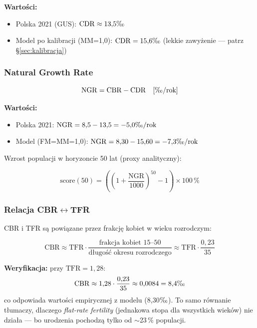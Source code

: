 \documentclass[11pt,a4paper]{article}
\newcommand{\promile}{\ensuremath{\text{\textperthousand}}}
\begin{document}
\textbf{Wartości:}
\begin{itemize}
  \item Polska 2021 (GUS): $\mathrm{CDR} \approx 13{,}5\promile$
  \item Model po kalibracji (MM=1{,}0): $\mathrm{CDR} = 15{,}6\promile$ (lekkie zawyżenie --- patrz \S\ref{sec:kalibracja})
\end{itemize}

\subsubsection{Natural Growth Rate}

\begin{formulabox}
\[
\mathrm{NGR} = \mathrm{CBR} - \mathrm{CDR} \quad [\promile/\text{rok}]
\]
\end{formulabox}

\textbf{Wartości:}
\begin{itemize}
  \item Polska 2021: $\mathrm{NGR} = 8{,}5 - 13{,}5 = -5{,}0\promile/\text{rok}$
  \item Model (FM=MM=1{,}0): $\mathrm{NGR} = 8{,}30 - 15{,}60 = -7{,}3\promile/\text{rok}$
\end{itemize}

Wzrost populacji w horyzoncie 50 lat (proxy analityczny):
\begin{formulabox}
\[
\text{score}(50) = \left( \left(1 + \frac{\mathrm{NGR}}{1000}\right)^{50} - 1 \right) \times 100\,\%
\]
\end{formulabox}

\subsubsection{Relacja CBR$\leftrightarrow$TFR}

CBR i TFR są powiązane przez frakcję kobiet w wieku rozrodczym:
\begin{formulabox}
\[
\mathrm{CBR} \approx \mathrm{TFR} \cdot \frac{\text{frakcja kobiet 15--50}}{\text{długość okresu rozrodczego}} \approx \mathrm{TFR} \cdot \frac{0{,}23}{35}
\]
\end{formulabox}

\textbf{Weryfikacja:} przy $\mathrm{TFR} = 1{,}28$:
\[
\mathrm{CBR} \approx 1{,}28 \cdot \frac{0{,}23}{35} \approx 0{,}0084 = 8{,}4\promile
\]
co odpowiada wartości empirycznej z modelu (8{,}30\promile). To samo równanie tłumaczy, dlaczego \emph{flat-rate fertility} (jednakowa stopa dla wszystkich wieków) nie działa --- bo urodzenia pochodzą tylko od $\sim$23\,\% populacji.
\end{document}

